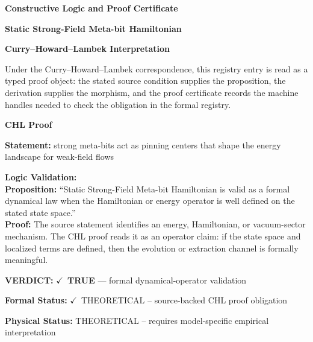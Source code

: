 \clearpage
\begingroup\tzpsupportsetup
\noindent\textbf{\fontsize{10.8pt}{12.8pt}\selectfont [ID 0338] Constructive Logic and Proof Certificate}\par
\noindent\textbf{\fontsize{10pt}{12pt}\selectfont Static Strong-Field Meta-bit Hamiltonian}\par
\vspace{0.45em}
\begingroup
\footnotesize
\setlength{\parskip}{0.22em}
\setlength{\parindent}{0pt}
\noindent\textbf{Curry--Howard--Lambek Interpretation}\par
Under the Curry--Howard--Lambek correspondence, this registry entry is read as a typed proof
object: the stated source condition supplies the proposition, the derivation supplies the
morphism, and the proof certificate records the machine handles needed to check the obligation
in the formal registry.

\vspace{0.45em}
\noindent\textbf{CHL Proof}\par
\textbf{Statement:} strong meta-bits act as pinning centers that shape the energy landscape for weak-field
flows

\textbf{Logic Validation:}\\
\textbf{Proposition:} ``Static Strong-Field Meta-bit Hamiltonian is valid as a formal dynamical law when the
Hamiltonian or energy operator is well defined on the stated state space.''\\
\textbf{Proof:} The source statement identifies an energy, Hamiltonian, or vacuum-sector mechanism. The
CHL proof reads it as an operator claim: if the state space and localized terms are
defined, then the evolution or extraction channel is formally meaningful.

\textbf{VERDICT:} \ensuremath{\checkmark}\ \textbf{TRUE} --- formal dynamical-operator validation

\textbf{Formal Status:} \ensuremath{\checkmark}\ THEORETICAL -- source-backed CHL proof obligation

\textbf{Physical Status:} THEORETICAL -- requires model-specific empirical interpretation
\par\vspace{0.45em}
\par
\ifTZPDarkEdition
{}
\fi
\endgroup
\endgroup
